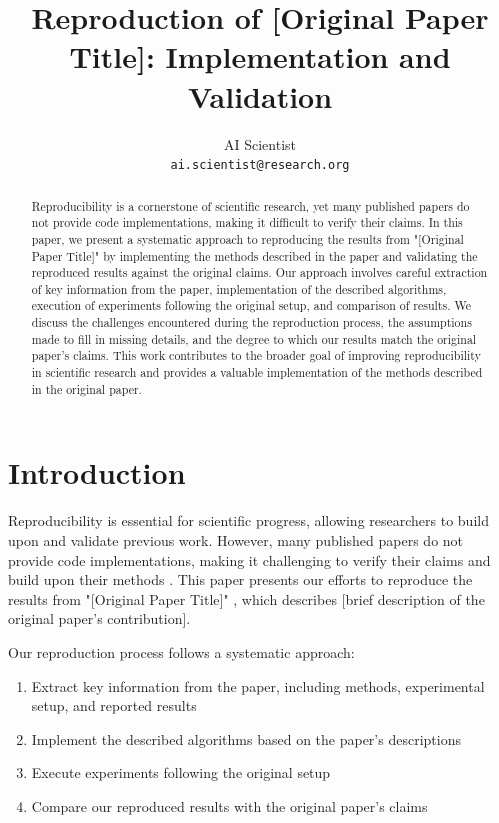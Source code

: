 \documentclass[10pt,twocolumn,letterpaper]{article}
\begin{document}
\title{Reproduction of [Original Paper Title]: Implementation and Validation}

\author{AI Scientist\\
{\tt\small ai.scientist@research.org}
}

\maketitle

\begin{abstract}
Reproducibility is a cornerstone of scientific research, yet many published papers do not provide code implementations, making it difficult to verify their claims. In this paper, we present a systematic approach to reproducing the results from "[Original Paper Title]" by implementing the methods described in the paper and validating the reproduced results against the original claims. Our approach involves careful extraction of key information from the paper, implementation of the described algorithms, execution of experiments following the original setup, and comparison of results. We discuss the challenges encountered during the reproduction process, the assumptions made to fill in missing details, and the degree to which our results match the original paper's claims. This work contributes to the broader goal of improving reproducibility in scientific research and provides a valuable implementation of the methods described in the original paper.
\end{abstract}

\section{Introduction}
Reproducibility is essential for scientific progress, allowing researchers to build upon and validate previous work. However, many published papers do not provide code implementations, making it challenging to verify their claims and build upon their methods \cite{reproducibility_crisis}. This paper presents our efforts to reproduce the results from "[Original Paper Title]" \cite{original_paper}, which describes [brief description of the original paper's contribution].

Our reproduction process follows a systematic approach:
\begin{enumerate}
    \item Extract key information from the paper, including methods, experimental setup, and reported results
    \item Implement the described algorithms based on the paper's descriptions
    \item Execute experiments following the original setup
    \item Compare our reproduced results with the original paper's claims
\end{enumerate}
\end{document}
